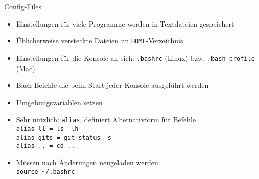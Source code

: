 \begin{frame}{Config-Files}
  \begin{itemize}
    \item Einstellungen für viele Programme werden in Textdateien gespeichert
    \item Üblicherweise versteckte Dateien im \texttt{HOME}-Verzeichnis
    \item Einstellungen für die Konsole an sich: \texttt{.bashrc} (Linux) bzw. \texttt{.bash\_profile} (Mac)
    \item Bash-Befehle die beim Start jeder Konsole ausgeführt werden
    \item Umgebungsvariablen setzen
    \item Sehr nützlich: \texttt{alias}, definiert Alternativform für Befehle \\
      \texttt{alias ll = ls -lh} \\
      \texttt{alias gits = git status -s} \\
      \texttt{alias .. = cd ..}
    \item Müssen nach Änderungen neugeladen werden:\\
      \texttt{source \textasciitilde/.bashrc}
  \end{itemize}
  
  
\end{frame}
